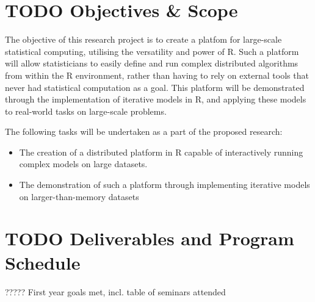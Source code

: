 \documentclass[a4paper,10pt]{article}
\begin{document}
\section{TODO Objectives \& Scope}

 The objective of this research project is to create a platfom for large-scale
 statistical computing, utilising the versatility and power of R.
 Such a platform will allow statisticians to easily define and run complex
 distributed algorithms from within the R environment, rather than having to
 rely on external tools that never had statistical computation as a goal.
 This platform will be demonstrated through the implementation of iterative
 models in R, and applying these models to real-world tasks on large-scale
 problems.

The following tasks will be undertaken as a part of the proposed research:

\begin{itemize}
	\item The creation of a distributed platform in R capable of
		interactively running complex models on large datasets.
	\item The demonstration of such a platform through implementing
		iterative models on larger-than-memory datasets
\end{itemize}

\section{TODO Deliverables and Program Schedule}

?????
First year goals met, incl. table of seminars attended

\printbibliography
\end{document}
